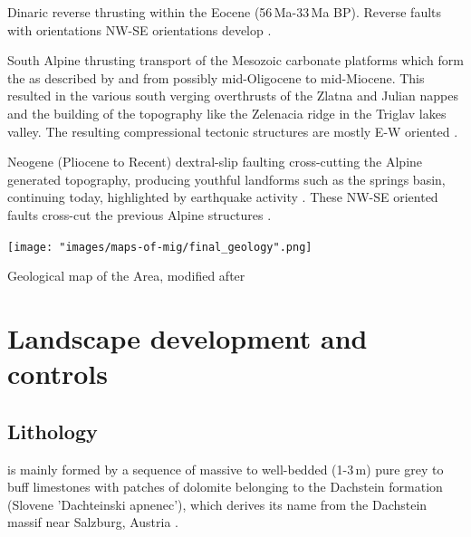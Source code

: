 \begin{citemize}
\item Dinaric reverse thrusting within the Eocene (56\,Ma-33\,Ma BP). Reverse faults with orientations NW-SE orientations develop  \citep{castellarin2000neo}.
\item South Alpine thrusting transport of the Mesozoic carbonate platforms which form the  as described by \citet{placer1998contribution} and \citet{buser1986tolmavc} from possibly mid-Oligocene to mid-Miocene. This resulted in the various south verging overthrusts of the Zlatna and Julian nappes and the building of the topography like the Zelenacia ridge in the Triglav lakes valley. The resulting compressional tectonic structures are mostly E-W oriented \citep{castellarin2000neo}.
\item Neogene (Pliocene to Recent) dextral-slip faulting cross-cutting the Alpine generated topography, producing youthful landforms such as the  springs basin, continuing today, highlighted by earthquake activity \citep{vsmuc2009tectonic,cunningham2006application}. These NW-SE oriented faults cross-cut the previous Alpine structures \citep{grenerczy2005tectonic}.
\end{citemize}

 \begin{pagemap}
 \checkoddpage \ifoddpage \forcerectofloat \else \forceversofloat \fi
\centering
  \texttt{[image: "images/maps-of-mig/final\_geology".png]}
  
  \caption{Geological map of the  Area, modified after \citet{buser1986tolmavc}}
  \label{map:mapofgeology}
 \end{pagemap}

\section{Landscape development and controls}
\subsection{Lithology}
\label{par:lithology}



 is mainly formed by a sequence of massive to well-bedded (1-3\,m) pure grey to buff limestones with patches of dolomite \citep{buser1986tolmavc} belonging to the Dachstein formation (Slovene 'Dachteinski apnenec'), which derives its name from the Dachstein massif near Salzburg, Austria \citep{ogorelec1996dachstein}. 


